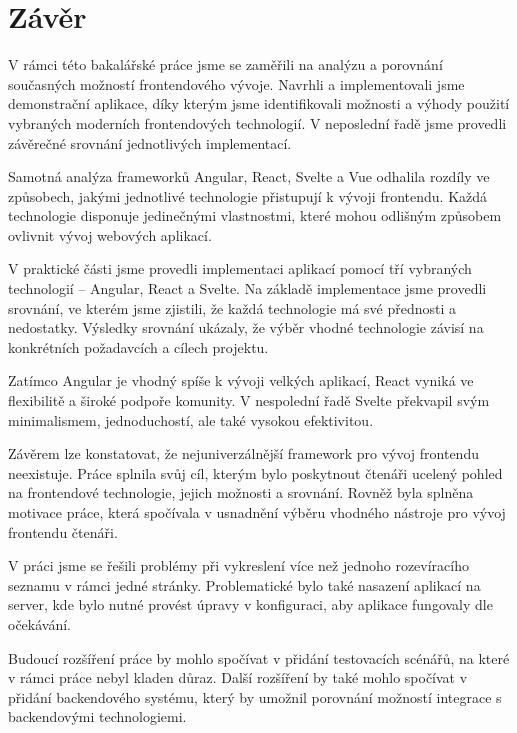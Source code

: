 \section*{Závěr}

\begin{zvyraznenyodstavec}
V rámci této bakalářské práce jsme se zaměřili na analýzu a porovnání současných možností frontendového vývoje. 
Navrhli a implementovali jsme demonstrační aplikace, díky kterým jsme identifikovali možnosti a výhody použití vybraných moderních frontendových technologií. 
V neposlední řadě jsme provedli závěrečné srovnání jednotlivých implementací.

Samotná analýza frameworků Angular, React, Svelte a Vue odhalila rozdíly ve způsobech, jakými jednotlivé technologie přistupují k vývoji frontendu. 
Každá technologie disponuje jedinečnými vlastnostmi, které mohou odlišným způsobem ovlivnit vývoj webových aplikací. 

V praktické části jsme provedli implementaci aplikací pomocí tří vybraných technologií -- Angular, React a Svelte. 
Na základě implementace jsme provedli srovnání, ve kterém jsme zjistili, že každá technologie má své přednosti a nedostatky. 
Výsledky srovnání ukázaly, že výběr vhodné technologie závisí na konkrétních požadavcích a cílech projektu.

Zatímco Angular je vhodný spíše k vývoji velkých aplikací, React vyniká ve flexibilitě a široké podpoře komunity. 
V nespolední řadě Svelte překvapil svým minimalismem, jednoduchostí, ale také vysokou efektivitou.

Závěrem lze konstatovat, že nejuniverzálnější framework pro vývoj frontendu neexistuje. 
Práce splnila svůj cíl, kterým bylo poskytnout čtenáři ucelený pohled na frontendové technologie, jejich možnosti a srovnání.
Rovněž byla splněna motivace práce, která spočívala v usnadnění výběru vhodného nástroje pro vývoj frontendu čtenáři.

V práci jsme se řešili problémy při vykreslení více než jednoho rozevíracího seznamu v rámci jedné stránky. 
Problematické bylo také nasazení aplikací na server, kde bylo nutné provést úpravy v konfiguraci, aby aplikace fungovaly dle očekávání.

Budoucí rozšíření práce by mohlo spočívat v přidání testovacích scénářů, na které v rámci práce nebyl kladen důraz. 
Další rozšíření by také mohlo spočívat v přidání backendového systému, který by umožnil porovnání možností integrace s backendovými technologiemi.
\end{zvyraznenyodstavec}

